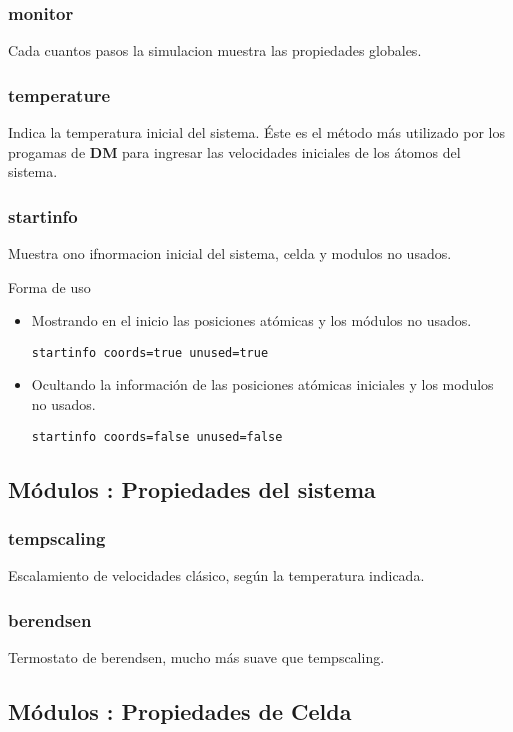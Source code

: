 \documentclass[a4paper,10pt]{scrbook}
\newcommand{\control}[1]{\begin{center}\begin{minipage}{10cm}\texttt{#1}\end{minipage}\end{center}}
\begin{document}
\subsubsection{monitor}
Cada cuantos pasos la simulacion muestra las propiedades globales.

\subsubsection{temperature}
Indica la temperatura inicial del sistema. \'Este es el m\'etodo m\'as utilizado por los progamas de \textbf{DM} para ingresar las velocidades iniciales de los \'atomos del sistema.

\subsubsection{startinfo}
Muestra ono ifnormacion inicial del sistema, celda y modulos no usados.

Forma de uso

\begin{itemize}
 \item Mostrando en el inicio las posiciones at\'omicas y los m\'odulos no usados.
\control{startinfo coords=true unused=true}
 \item Ocultando la informaci\'on de las posiciones at\'omicas iniciales y los modulos no usados.
\control{startinfo coords=false unused=false}
\end{itemize}

\subsection{M\'odulos : Propiedades del sistema}
\subsubsection{tempscaling}
Escalamiento de velocidades cl\'asico, seg\'un la temperatura indicada.
\subsubsection{berendsen}
Termostato de berendsen, mucho m\'as suave que tempscaling.

\subsection{M\'odulos : Propiedades de Celda}
\end{document}

